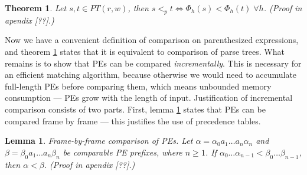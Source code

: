 \documentclass[AMA,STIX1COL]{WileyNJD-v2}
\newtheorem{XThe}{Theorem}
\newtheorem{XLem}{Lemma}
\begin{document}
    \begin{XThe}\label{theorem_order_on_pe_same_as_on_pt}
    Let $s, t \in PT(r, w)$, then
    $s <_p t \Leftrightarrow \Phi_{h}(s) < \Phi_{h}(t) \; \forall h$.
    (Proof in apendix [??].)
    \end{XThe}

Now we have a convenient definition of comparison on parenthesized expressions,
and theorem \ref{theorem_order_on_pe_same_as_on_pt} states that it is equivalent to comparison of parse trees.
What remains is to show that PEs can be compared \emph{incrementally}.
This is necessary for an efficient matching algorithm,
because otherwise we would need to accumulate full-length PEs before comparing them,
which means unbounded memory consumption --- PEs grow with the length of input.
Justification of incremental comparison consists of two parts.
First, lemma \ref{lemma_incr_cmp_frames} states that PEs can be compared frame by frame ---
this justifies the use of precedence tables.

    \begin{XLem}\label{lemma_incr_cmp_frames}
    \emph{Frame-by-frame comparison of PEs.}
    Let $\alpha = \alpha_0 a_1 \dots a_n \alpha_n$ and
    $\beta = \beta_0 a_1 \dots a_n \beta_n$ be comparable PE prefixes, where $n \geq 1$.
    If $\alpha_0 \dots \alpha_{n-1} < \beta_0 \dots \beta_{n-1}$,
    then $\alpha < \beta$.
    (Proof in apendix [??].)
    \end{XLem}
\end{document}

